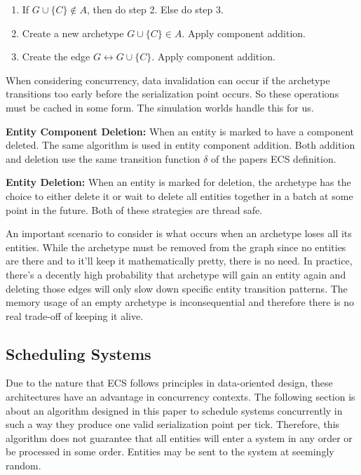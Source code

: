 \begin{enumerate}
    \item If $G \cup \{C\} \not\in A$, then do step 2. Else do step 3.
    \item Create a new archetype $G \cup \{C\} \in A$. Apply component addition.
    \item Create the edge $G \leftrightarrow G \cup \{C\}$. Apply component addition.
\end{enumerate}

When considering concurrency, data invalidation can occur if the archetype transitions too early before the serialization point occurs. So these operations must be cached in some form. The simulation worlds handle this for us.

\textbf{Entity Component Deletion: } When an entity is marked to have a component deleted. The same algorithm is used in entity component addition. Both addition and deletion use the same transition function $\delta$ of the papers ECS definition.  

\textbf{Entity Deletion: }
When an entity is marked for deletion, the archetype has the choice to either delete it or wait to delete all entities together in a batch at some point in the future. Both of these strategies are thread safe. 

An important scenario to consider is what occurs when an archetype loses all its entities. While the archetype must be removed from the graph since no entities are there and to it'll keep it mathematically pretty, there is no need. In practice, there's a decently high probability that archetype will gain an entity again and deleting those edges will only slow down specific entity transition patterns. The memory usage of an empty archetype is inconsequential and therefore there is no real trade-off of keeping it alive.

\subsection{Scheduling Systems}
\label{sec:scheduling}

Due to the nature that ECS follows principles in data-oriented design, these architectures have an advantage in concurrency contexts. The following section is about an algorithm designed in this paper to schedule systems concurrently in such a way they produce one valid serialization point per tick. Therefore, this algorithm does not guarantee that all entities will enter a system in any order or be processed in some order. Entities may be sent to the system at seemingly random.

